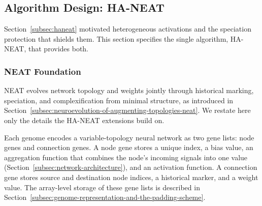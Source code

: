 \documentclass[12pt]{article}
\begin{document}
\subsection{Algorithm Design: HA-NEAT}
\label{subsec:algorithm-design-ha-neat}

Section~\ref{subsec:haneat} motivated heterogeneous activations and the speciation protection that shields them. This section specifies the single algorithm, HA-NEAT, that provides both.

\subsubsection{NEAT Foundation}
\label{subsubsec:neat-foundation}

NEAT evolves network topology and weights jointly through historical marking, speciation, and complexification from minimal structure, as introduced in Section~\ref{subsec:neuroevolution-of-augmenting-topologies-neat}.
We restate here only the details the HA-NEAT extensions build on.

Each genome encodes a variable-topology neural network as two gene lists: node genes and connection genes.
A node gene stores a unique index, a bias value, an aggregation function that combines the node's incoming signals into one value (Section~\ref{subsec:network-architecture}), and an activation function.
A connection gene stores source and destination node indices, a historical marker, and a weight value.
The array-level storage of these gene lists is described in Section~\ref{subsec:genome-representation-and-the-padding-scheme}.
\end{document}
